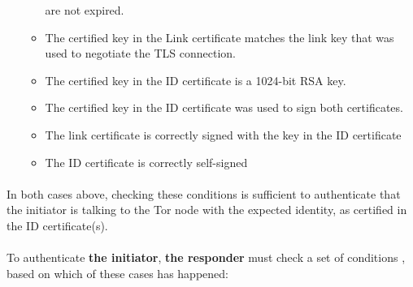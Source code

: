 \begin{enumerate}
\begin{itemize}
            are not expired.
            \item The certified key in the Link certificate matches the
            link key that was used to negotiate the TLS connection.
            \item The certified key in the ID certificate is a 1024-bit RSA key.
            \item The certified key in the ID certificate was used to sign both
            certificates.
            \item The link certificate is correctly signed with the key in the
            ID certificate
            \item The ID certificate is correctly self-signed
        \end{itemize}
\end{enumerate}


\paragraph{}
In both cases above, checking these conditions is sufficient to
authenticate that the initiator is talking to the Tor node with the
expected identity, as certified in the ID certificate(s).

\paragraph{}
To authenticate \textbf{the initiator}, \textbf{the responder} must check a set of conditions ,
based on which of these cases has happened:

